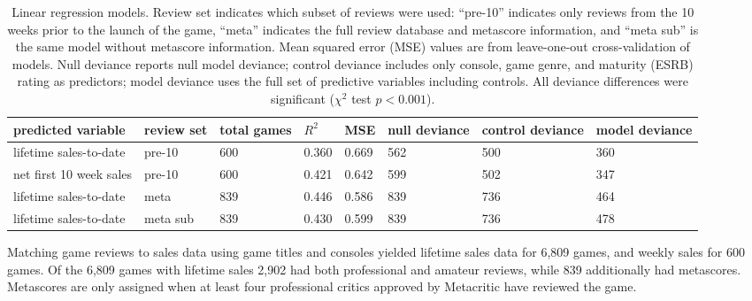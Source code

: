 \documentclass{sig-alternate}
\begin{document}
\begin{table}[tb]
\centering
\small
\sffamily
\begin{tabular}{llllllll}
predicted variable & review set & total games & $R^2$ & MSE & null deviance & control deviance & model deviance \\ 
\midrule lifetime sales-to-date & pre-10 & 600 & 0.360 & 0.669 & 562 & 500 & 360\\ 
net first 10 week sales & pre-10 & 600 & 0.421 & 0.642 & 599 & 502 & 347\\ 
lifetime sales-to-date & meta & 839 & 0.446 & 0.586 & 839 & 736 & 464\\ 
lifetime sales-to-date & meta sub & 839 & 0.430 & 0.599 & 839 & 736 & 478\\ 
\end{tabular}
\caption{Linear regression models. Review set indicates which subset of reviews were used:
``pre-10'' indicates only reviews from the 10 weeks prior to the launch of the game,
``meta'' indicates the full review database and metascore information, and ``meta sub'' is the same model without metascore information. 
Mean squared error (MSE) values are from leave-one-out cross-validation of models. Null deviance reports null model deviance; control deviance includes only console, game genre, and maturity (ESRB) rating as predictors; model deviance uses the full set of predictive variables including controls. All deviance differences were significant ($\chi^2$ test $p < 0.001$).}
\label{tab:regression_models}
\end{table}

Matching game reviews to sales data using game titles and consoles yielded lifetime sales data for 6,809 games, and weekly sales for 600 games. Of the 6,809 games with lifetime sales 2,902 had both professional and amateur reviews, while 839 additionally had metascores. Metascores are only assigned when at least four professional critics approved by Metacritic have reviewed the game.
\end{document}
